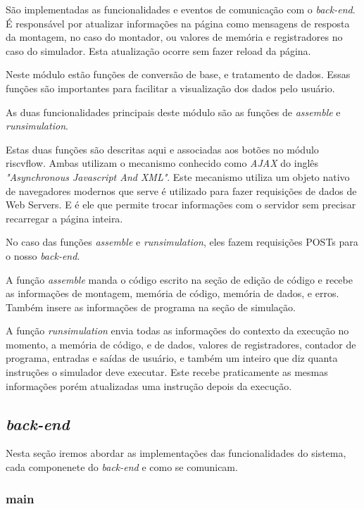 				São implementadas as funcionalidades e eventos de comunicação com o \textit{back-end}. É responsável por atualizar informações na página como mensagens de resposta da montagem, no caso do montador, ou valores de memória e registradores no caso do simulador. Esta atualização ocorre sem fazer reload da página.

				Neste módulo estão funções de conversão de base, e tratamento de dados. Essas funções são importantes para facilitar a visualização dos dados pelo usuário.

				As duas funcionalidades principais deste módulo são as funções de \textit{assemble} e \textit{run\textunderscore simulation}. 

				Estas duas funções são descritas aqui e associadas aos botões no módulo riscv\textunderscore flow. Ambas utilizam o mecanismo conhecido como \textit{AJAX} do inglês \textit{"Asynchronous Javascript And XML"}. Este mecanismo utiliza um objeto nativo de navegadores modernos que serve é utilizado para fazer requisições de dados de Web Servers. E é ele que permite trocar informações com o servidor sem precisar recarregar a página inteira.

				No caso das funções \textit{assemble} e \textit{run\textunderscore simulation}, eles fazem requisições POSTs para o nosso \textit{back-end}.

				A função \textit{assemble} manda o código escrito na seção de edição de código e recebe as informações de montagem, memória de código, memória de dados, e erros. Também insere as informações de programa na seção de simulação.

				A função \textit{run\textunderscore simulation} envia todas as informações do contexto da execução no momento, a memória de código, e de dados, valores de registradores, contador de programa, entradas e saídas de usuário, e também um inteiro que diz quanta instruções o simulador deve executar. Este recebe praticamente as mesmas informações porém atualizadas uma instrução depois da execução.


	\subsection{\textit{back-end}}

		Nesta seção iremos abordar as implementações das funcionalidades do sistema, cada componenete do \textit{back-end} e como se comunicam.

		\subsubsection{main}

